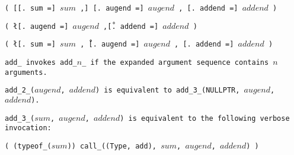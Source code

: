 
\s\s\s\tt{(} [[\tt{. sum =}] $sum$ \tt{,}]
[\tt{. augend =}] $augend$ \tt{,} [\tt{. addend =}] $addend$ \tt{)}

\s\tt{(} \l[\tt{. augend =}]
$augend$ \tt{,}\r [\tt{. addend =}] $addend$ \tt{)}

\s\tt{(} \l[\tt{. sum =}] $sum$ \tt{,}\r\
[\tt{. augend =}] $augend$ \tt{,} [\tt{. addend =}] $addend$ \tt{)}


\tt{add_} invokes \tt{add_}$n$\_ if the
expanded argument sequence contains $n$ arguments.

\tt{add_2_(}$augend$\tt{,} $addend$\tt{)} is equivalent to
\tt{add_3_(NULLPTR,} $augend$\tt{,} $addend$\tt{)}.

\tt{add_3_(}$sum$\tt{,} $augend$\tt{,} $addend$\tt{)}
is equivalent to the following verbose invocation:

\enlargethispage*{\baselineskip}
\begin{center}
\tt{( (typeof_(}$sum$\tt{)) call_((Type, add),}
$sum$\tt{,} $augend$\tt{,} $addend$\tt{) )}
\end{center}
